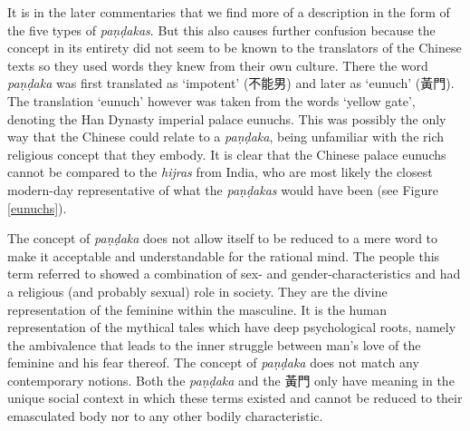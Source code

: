 It is in the later commentaries that we find more of a description in the form of the five types of \textit{paṇḍakas}. But this also causes further confusion because the concept in its entirety did not seem to be known to the translators of the Chinese texts so they used words they knew from their own culture. There the word \textit{paṇḍaka} was first translated as `impotent' (不能男) and later as `eunuch' (黃門). The translation `eunuch' however was taken from the words `yellow gate', denoting the Han Dynasty imperial palace eunuchs. This was possibly the only way that the Chinese could relate to a \textit{paṇḍaka}, being unfamiliar with the rich religious concept that they embody. It is clear that the Chinese palace eunuchs cannot be compared to the \textit{hijras} from India, who are most likely the closest modern-day representative of what the \textit{paṇḍakas} would have been (see Figure \ref{eunuchs}).

The concept of \textit{paṇḍaka} does not allow itself to be reduced to a mere word to make it acceptable and understandable for the rational mind. The people this term referred to showed a combination of sex- and gender-characteristics and had a religious (and probably sexual) role in society. They are the divine representation of the feminine within the masculine. It is the human representation of the mythical tales which have deep psychological roots, namely the ambivalence that leads to the inner struggle between man's love of the feminine and his fear thereof. The concept of \textit{paṇḍaka} does not match any contemporary notions. Both the \textit{paṇḍaka} and the 黃門 only have meaning in the unique social context in which these terms existed and cannot be reduced to their emasculated body nor to any other bodily characteristic.
